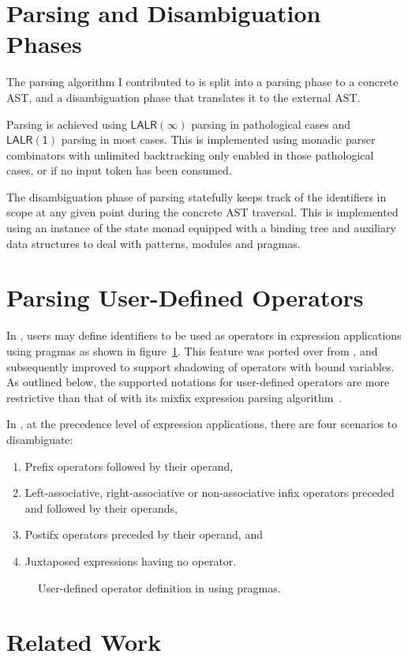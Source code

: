 


\section{\Beluga Parsing and Disambiguation Phases}

The parsing algorithm I contributed to \Beluga is split into a parsing phase to a concrete \ac{AST}, and a disambiguation phase that translates it to the external \ac{AST}.

Parsing is achieved using $ \mathsf{LALR(\infty)} $ parsing in pathological cases and $ \mathsf{LALR(1)} $ parsing in most cases.
This is implemented using monadic parser combinators with unlimited backtracking only enabled in those pathological cases, or if no input token has been consumed.

The disambiguation phase of parsing statefully keeps track of the identifiers in scope at any given point during the concrete \ac{AST} traversal.
This is implemented using an instance of the state monad equipped with a binding tree and auxiliary data structures to deal with patterns, modules and pragmas.

\section{Parsing User-Defined Operators}

In \Beluga, users may define identifiers to be used as operators in expression applications using pragmas as shown in figure~\ref{figure:operator-pragmas}.
This feature was ported over from \Twelf, and subsequently improved to support shadowing of operators with bound variables.
As outlined below, the supported notations for user-defined operators are more restrictive than that of \Agda with its mixfix expression parsing algorithm~\cite{danielsson2008parsing}.

In \Beluga, at the precedence level of expression applications, there are four scenarios to disambiguate:
\begin{enumerate}
\item Prefix operators followed by their operand,
\item Left-associative, right-associative or non-associative infix operators preceded and followed by their operands,
\item Postifx operators preceded by their operand, and
\item Juxtaposed expressions having no operator.
\end{enumerate}

\begin{figure}[!htb]
\label{figure:operator-pragmas}
\caption{User-defined operator definition in \Beluga using pragmas.}
\end{figure}

\section{Related Work}
